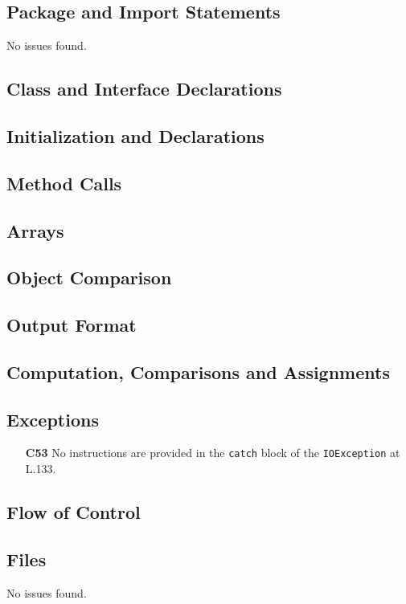 \subsection{Package and Import Statements}
No issues found.

\subsection{Class and Interface Declarations}
\blindtext

\subsection{Initialization and Declarations}
\blindtext

\subsection{Method Calls}
\blindtext

\subsection{Arrays}
\blindtext

\subsection{Object Comparison}
\blindtext

\subsection{Output Format}
\blindtext

\subsection{Computation, Comparisons and Assignments}
\blindtext

\subsection{Exceptions}
	\begin{itemize}
		\item[\textbf{C53}] No instructions are provided in the \texttt{catch} block of the \texttt{IOException} at L.133.
	\end{itemize}

\subsection{Flow of Control}
\blindtext

\subsection{Files}
No issues found.
